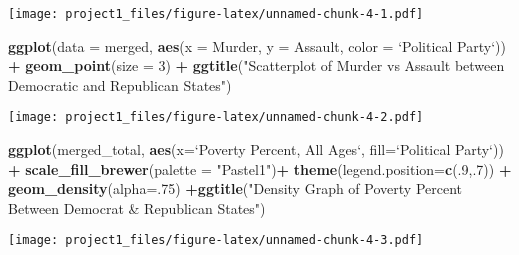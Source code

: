 \documentclass[]{article}
\newenvironment{Shaded}{\begin{snugshade}}{\end{snugshade}}
\newcommand{\DataTypeTok}[1]{\textcolor[rgb]{0.13,0.29,0.53}{#1}}
\newcommand{\DecValTok}[1]{\textcolor[rgb]{0.00,0.00,0.81}{#1}}
\newcommand{\KeywordTok}[1]{\textcolor[rgb]{0.13,0.29,0.53}{\textbf{#1}}}
\newcommand{\NormalTok}[1]{#1}
\newcommand{\OperatorTok}[1]{\textcolor[rgb]{0.81,0.36,0.00}{\textbf{#1}}}
\newcommand{\StringTok}[1]{\textcolor[rgb]{0.31,0.60,0.02}{#1}}
\begin{document}
\texttt{[image: project1\_files/figure-latex/unnamed-chunk-4-1.pdf]}

\begin{Shaded}
\begin{Highlighting}[]
\KeywordTok{ggplot}\NormalTok{(}\DataTypeTok{data =}\NormalTok{ merged, }\KeywordTok{aes}\NormalTok{(}\DataTypeTok{x =}\NormalTok{ Murder, }\DataTypeTok{y =}\NormalTok{ Assault, }\DataTypeTok{color =} \StringTok{`}\DataTypeTok{Political Party}\StringTok{`}\NormalTok{)) }\OperatorTok{+}
\StringTok{  }\KeywordTok{geom_point}\NormalTok{(}\DataTypeTok{size =} \DecValTok{3}\NormalTok{) }\OperatorTok{+}\StringTok{ }\KeywordTok{ggtitle}\NormalTok{(}\StringTok{"Scatterplot of Murder vs Assault between Democratic and Republican States"}\NormalTok{)}
\end{Highlighting}
\end{Shaded}

\texttt{[image: project1\_files/figure-latex/unnamed-chunk-4-2.pdf]}

\begin{Shaded}
\begin{Highlighting}[]
\KeywordTok{ggplot}\NormalTok{(merged_total, }\KeywordTok{aes}\NormalTok{(}\DataTypeTok{x=}\StringTok{`}\DataTypeTok{Poverty Percent, All Ages}\StringTok{`}\NormalTok{, }\DataTypeTok{fill=}\StringTok{`}\DataTypeTok{Political Party}\StringTok{`}\NormalTok{)) }\OperatorTok{+}\StringTok{ }\KeywordTok{scale_fill_brewer}\NormalTok{(}\DataTypeTok{palette =} \StringTok{"Pastel1"}\NormalTok{)}\OperatorTok{+}\StringTok{  }\KeywordTok{theme}\NormalTok{(}\DataTypeTok{legend.position=}\KeywordTok{c}\NormalTok{(.}\DecValTok{9}\NormalTok{,.}\DecValTok{7}\NormalTok{)) }\OperatorTok{+}\StringTok{ }\KeywordTok{geom_density}\NormalTok{(}\DataTypeTok{alpha=}\NormalTok{.}\DecValTok{75}\NormalTok{) }\OperatorTok{+}\KeywordTok{ggtitle}\NormalTok{(}\StringTok{"Density Graph of Poverty Percent Between Democrat & Republican States"}\NormalTok{)}
\end{Highlighting}
\end{Shaded}

\texttt{[image: project1\_files/figure-latex/unnamed-chunk-4-3.pdf]}
\end{document}
